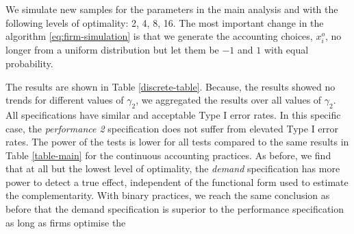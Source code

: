 \documentclass[12pt]{article}
\begin{document}
We simulate new samples for the parameters in the main analysis and with the following levels of optimality: 2, 4, 8, 16. The most important change in the algorithm \eqref{eq:firm-simulation} is that we generate the accounting choices, $x_i^o$, no longer from a uniform distribution but let them be $-1$ and $1$ with equal probability.

The results are shown in Table \ref{discrete-table}. Because, the results showed no trends for different values of $\gamma_2$, we aggregated the results over all values of $\gamma_2$.  All specifications have similar and acceptable Type I error rates. In this specific case, the \emph{performance 2} specification does not suffer from elevated Type I error rates. The power of the tests is lower for all tests compared to the same results in Table \ref{table-main} for the continuous accounting practices. As before, we find that at all but the lowest level of optimality, the \emph{demand} specification has more power to detect a true effect, independent of the functional form used to estimate the complementarity. With binary practices, we reach the same conclusion as before that the demand specification is superior to the performance specification as long as firms optimise the 


\end{document}
